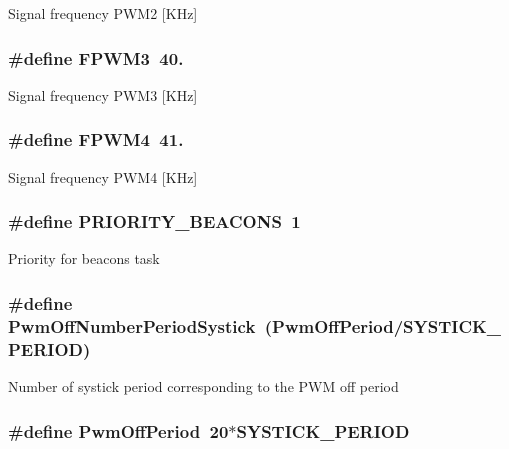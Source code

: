 Signal frequency P\+W\+M2 \mbox{[}K\+Hz\mbox{]} \hypertarget{group__beacon_signal___macro_ga463b5670a5e6079824d642fb58831e3d}{
\subsubsection[{F\+P\+W\+M3}]{\setlength{\rightskip}{0pt plus 5cm}\#define F\+P\+W\+M3~40.}}\label{group__beacon_signal___macro_ga463b5670a5e6079824d642fb58831e3d}
Signal frequency P\+W\+M3 \mbox{[}K\+Hz\mbox{]} \hypertarget{group__beacon_signal___macro_gaaa94e02e49348091ccf2d3e22ab2d182}{
\subsubsection[{F\+P\+W\+M4}]{\setlength{\rightskip}{0pt plus 5cm}\#define F\+P\+W\+M4~41.}}\label{group__beacon_signal___macro_gaaa94e02e49348091ccf2d3e22ab2d182}
Signal frequency P\+W\+M4 \mbox{[}K\+Hz\mbox{]} \hypertarget{group__beacon_signal___macro_ga1ffb3dcd8bce37755a7ef4a7b5f06e35}{
\subsubsection[{P\+R\+I\+O\+R\+I\+T\+Y\+\_\+\+B\+E\+A\+C\+O\+N\+S}]{\setlength{\rightskip}{0pt plus 5cm}\#define P\+R\+I\+O\+R\+I\+T\+Y\+\_\+\+B\+E\+A\+C\+O\+N\+S~1}}\label{group__beacon_signal___macro_ga1ffb3dcd8bce37755a7ef4a7b5f06e35}
Priority for beacons task \hypertarget{group__beacon_signal___macro_ga0b93440feb629d65e8fa2efc5c85721d}{
\subsubsection[{Pwm\+Off\+Number\+Period\+Systick}]{\setlength{\rightskip}{0pt plus 5cm}\#define Pwm\+Off\+Number\+Period\+Systick~({\bf Pwm\+Off\+Period}/{\bf S\+Y\+S\+T\+I\+C\+K\+\_\+\+P\+E\+R\+I\+O\+D})}}\label{group__beacon_signal___macro_ga0b93440feb629d65e8fa2efc5c85721d}
Number of systick period corresponding to the P\+W\+M off period \hypertarget{group__beacon_signal___macro_ga9fa466e88ff831cc8a2cbcf68f153dd5}{
\subsubsection[{Pwm\+Off\+Period}]{\setlength{\rightskip}{0pt plus 5cm}\#define Pwm\+Off\+Period~20$\ast${\bf S\+Y\+S\+T\+I\+C\+K\+\_\+\+P\+E\+R\+I\+O\+D}}}\label{group__beacon_signal___macro_ga9fa466e88ff831cc8a2cbcf68f153dd5}
